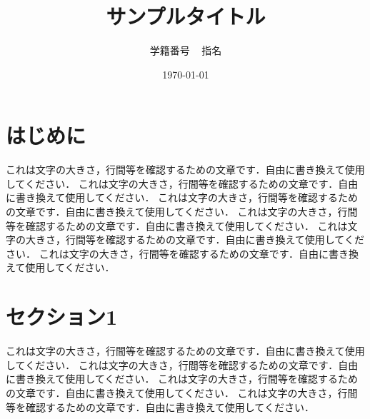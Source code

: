 \documentclass[11pt]{jsarticle}  %
\begin{document}
\title{
サンプルタイトル
}

\date{\large \today}
\author{
  \large {学籍番号} ~ {指名}
}

\maketitle
\section{はじめに}
\label{sec:intro}
これは文字の大きさ，行間等を確認するための文章です．自由に書き換えて使用してください．
これは文字の大きさ，行間等を確認するための文章です．自由に書き換えて使用してください．
これは文字の大きさ，行間等を確認するための文章です．自由に書き換えて使用してください．
これは文字の大きさ，行間等を確認するための文章です．自由に書き換えて使用してください．
これは文字の大きさ，行間等を確認するための文章です．自由に書き換えて使用してください．
これは文字の大きさ，行間等を確認するための文章です．自由に書き換えて使用してください．


\section{セクション1\cite{AAA}}
\label{sec:section1}
これは文字の大きさ，行間等を確認するための文章です．自由に書き換えて使用してください．
これは文字の大きさ，行間等を確認するための文章です．自由に書き換えて使用してください．
これは文字の大きさ，行間等を確認するための文章です．自由に書き換えて使用してください．
これは文字の大きさ，行間等を確認するための文章です．自由に書き換えて使用してください．


\end{document}
